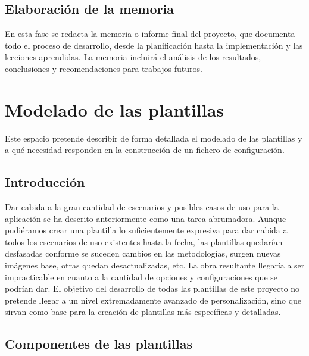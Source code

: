 \documentclass[12pt, a4paper, twoside]{article}
\begin{document}
\subsection{Elaboración de la memoria}
En esta fase se redacta la memoria o informe final del proyecto, que documenta todo el proceso de desarrollo, desde la 
planificación hasta la implementación y las lecciones aprendidas. La memoria incluirá el análisis de los resultados, 
conclusiones y recomendaciones para trabajos futuros. 



















\section{Modelado de las plantillas}
\label{sec:Modelado de las plantillas}
Este espacio pretende describir de forma detallada el modelado de las plantillas y a qué necesidad responden en la construcción de un fichero de configuración.
\subsection{Introducción}
Dar cabida a la gran cantidad de escenarios y posibles casos de uso para la aplicación se ha descrito anteriormente como una tarea abrumadora.
Aunque pudiéramos crear una plantilla lo suficientemente expresiva para dar cabida a todos los escenarios de uso existentes hasta la fecha, las plantillas quedarían desfasadas conforme se suceden cambios 
en las metodologías, surgen nuevas imágenes base, otras quedan desactualizadas, etc. La obra resultante llegaría a ser impracticable en cuanto a la cantidad de opciones y configuraciones que se podrían dar.
El objetivo del desarrollo de todas las plantillas de este proyecto no pretende llegar a un nivel extremadamente avanzado de personalización, sino que sirvan como base para la creación de plantillas más específicas y detalladas.

\newpage

\subsection{Componentes de las plantillas}
\end{document}
